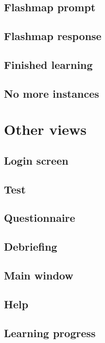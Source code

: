 \subsection{Flashmap prompt}

\subsection{Flashmap response}

\subsection{Finished learning}

\subsection{No more instances}

\section{Other views}

\subsection{Login screen}

\subsection{Test}

\subsection{Questionnaire}

\subsection{Debriefing}

\subsection{Main window}

\subsection{Help}

\subsection{Learning progress}
\label{sec:learningprogress}

